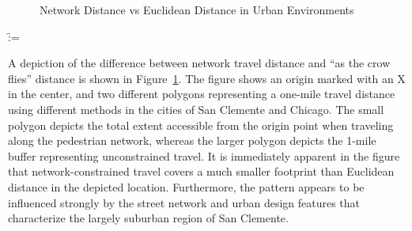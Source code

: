 \documentclass[
  10pt,
]{article}
\makeatletter
\newcounter{pandoccrossref@subfigures@footnote@counter}
\newenvironment{pandoccrossrefsubfigures}{%
\setcounter{pandoccrossref@subfigures@footnote@counter}{0}
\begin{figure}\centering%
\gdef\global@pandoccrossref@subfigures@footnotes{}%
\DeclareRobustCommand{\footnote}[1]{\footnotemark%
\stepcounter{pandoccrossref@subfigures@footnote@counter}%
\ifx\global@pandoccrossref@subfigures@footnotes\empty%
\gdef\global@pandoccrossref@subfigures@footnotes{{##1}}%
\else%
\g@addto@macro\global@pandoccrossref@subfigures@footnotes{, {##1}}%
\fi}}%
{\end{figure}%
\addtocounter{footnote}{-\value{pandoccrossref@subfigures@footnote@counter}}
\@for\f:=\global@pandoccrossref@subfigures@footnotes\do{\stepcounter{footnote}\footnotetext{\f}}%
\gdef\global@pandoccrossref@subfigures@footnotes{}}
\makeatother
\begin{document}
\begin{pandoccrossrefsubfigures}


\caption[{Network Distance vs Euclidean Distance in Urban
Environments}]{Network Distance vs Euclidean Distance in Urban
Environments}

\label{fig:network_distance}

\end{pandoccrossrefsubfigures}

A depiction of the difference between network travel distance and ``as
the crow flies'' distance is shown in Figure~\ref{fig:network_distance}.
The figure shows an origin marked with an X in the center, and two
different polygons representing a one-mile travel distance using
different methods in the cities of San Clemente and Chicago. The small
polygon depicts the total extent accessible from the origin point when
traveling along the pedestrian network, whereas the larger polygon
depicts the 1-mile buffer representing unconstrained travel. It is
immediately apparent in the figure that network-constrained travel
covers a much smaller footprint than Euclidean distance in the depicted
location. Furthermore, the pattern appears to be influenced strongly by
the street network and urban design features that characterize the
largely suburban region of San Clemente.
\end{document}
